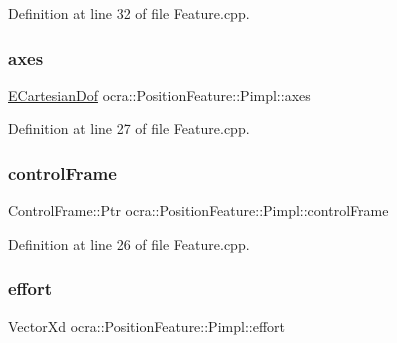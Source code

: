 Definition at line 32 of file Feature.\+cpp.

\hypertarget{structocra_1_1PositionFeature_1_1Pimpl_a671e502b35c4d7ec8c8f972933ebac1e}{}\label{structocra_1_1PositionFeature_1_1Pimpl_a671e502b35c4d7ec8c8f972933ebac1e} 
\subsubsection{\texorpdfstring{axes}{axes}}
{\footnotesize\ttfamily \hyperlink{namespaceocra_a436781c7059a0f76027df1c652126260}{E\+Cartesian\+Dof} ocra\+::\+Position\+Feature\+::\+Pimpl\+::axes}



Definition at line 27 of file Feature.\+cpp.

\hypertarget{structocra_1_1PositionFeature_1_1Pimpl_ad770aac1608c2e6ccf13ee84539313c5}{}\label{structocra_1_1PositionFeature_1_1Pimpl_ad770aac1608c2e6ccf13ee84539313c5} 
\subsubsection{\texorpdfstring{control\+Frame}{controlFrame}}
{\footnotesize\ttfamily Control\+Frame\+::\+Ptr ocra\+::\+Position\+Feature\+::\+Pimpl\+::control\+Frame}



Definition at line 26 of file Feature.\+cpp.

\hypertarget{structocra_1_1PositionFeature_1_1Pimpl_a66425331a37215913daa3ca7de5bce57}{}\label{structocra_1_1PositionFeature_1_1Pimpl_a66425331a37215913daa3ca7de5bce57} 
\subsubsection{\texorpdfstring{effort}{effort}}
{\footnotesize\ttfamily Vector\+Xd ocra\+::\+Position\+Feature\+::\+Pimpl\+::effort}



